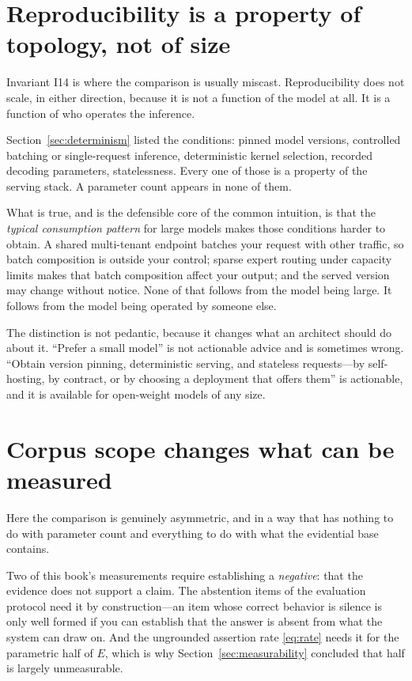 \section{Reproducibility is a property of topology, not of size}

Invariant I14 is where the comparison is usually miscast. Reproducibility does not
scale, in either direction, because it is not a function of the model at all. It is a
function of who operates the inference.

Section~\ref{sec:determinism} listed the conditions: pinned model versions,
controlled batching or single-request inference, deterministic kernel selection,
recorded decoding parameters, statelessness. Every one of those is a property of the
serving stack. A parameter count appears in none of them.

What is true, and is the defensible core of the common intuition, is that the
\emph{typical consumption pattern} for large models makes those conditions harder to
obtain. A shared multi-tenant endpoint batches your request with other traffic, so
batch composition is outside your control; sparse expert routing under capacity
limits makes that batch composition affect your output; and the served version may
change without notice. None of that follows from the model being large. It follows
from the model being operated by someone else.

The distinction is not pedantic, because it changes what an architect should do about
it. ``Prefer a small model'' is not actionable advice and is sometimes wrong.
``Obtain version pinning, deterministic serving, and stateless requests---by
self-hosting, by contract, or by choosing a deployment that offers them'' is
actionable, and it is available for open-weight models of any size.

\section{Corpus scope changes what can be measured}
\label{sec:corpus-scope}

Here the comparison is genuinely asymmetric, and in a way that has nothing to do with
parameter count and everything to do with what the evidential base contains.

Two of this book's measurements require establishing a \emph{negative}: that the
evidence does not support a claim. The abstention items of the
evaluation protocol need it by construction---an item whose correct
behavior is silence is only well formed if you can establish that the answer is
absent from what the system can draw on. And the ungrounded assertion rate
\eqref{eq:rate} needs it for the parametric half of $E$, which is why
Section~\ref{sec:measurability} concluded that half is largely unmeasurable.


